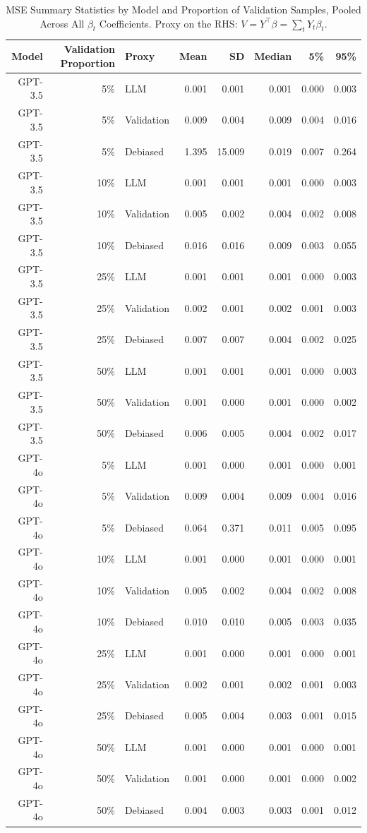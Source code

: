 \begin{table}

\caption{MSE Summary Statistics by Model and Proportion of Validation Samples, Pooled Across All $\beta_{t}$ Coefficients. Proxy on the RHS: $V = Y^\top \beta = \sum_{t} Y_t \beta_t$.}
\centering
\begin{tabular}[t]{rrlrrrrr}
\toprule
Model & Validation Proportion & Proxy & Mean & SD & Median & 5\% & 95\%\\
\midrule
GPT-3.5 & 5\% & LLM & 0.001 & 0.001 & 0.001 & 0.000 & 0.003\\
GPT-3.5 & 5\% & Validation & 0.009 & 0.004 & 0.009 & 0.004 & 0.016\\
GPT-3.5 & 5\% & Debiased & 1.395 & 15.009 & 0.019 & 0.007 & 0.264\\
GPT-3.5 & 10\% & LLM & 0.001 & 0.001 & 0.001 & 0.000 & 0.003\\
GPT-3.5 & 10\% & Validation & 0.005 & 0.002 & 0.004 & 0.002 & 0.008\\
GPT-3.5 & 10\% & Debiased & 0.016 & 0.016 & 0.009 & 0.003 & 0.055\\
GPT-3.5 & 25\% & LLM & 0.001 & 0.001 & 0.001 & 0.000 & 0.003\\
GPT-3.5 & 25\% & Validation & 0.002 & 0.001 & 0.002 & 0.001 & 0.003\\
GPT-3.5 & 25\% & Debiased & 0.007 & 0.007 & 0.004 & 0.002 & 0.025\\
GPT-3.5 & 50\% & LLM & 0.001 & 0.001 & 0.001 & 0.000 & 0.003\\
GPT-3.5 & 50\% & Validation & 0.001 & 0.000 & 0.001 & 0.000 & 0.002\\
GPT-3.5 & 50\% & Debiased & 0.006 & 0.005 & 0.004 & 0.002 & 0.017\\
GPT-4o & 5\% & LLM & 0.001 & 0.000 & 0.001 & 0.000 & 0.001\\
GPT-4o & 5\% & Validation & 0.009 & 0.004 & 0.009 & 0.004 & 0.016\\
GPT-4o & 5\% & Debiased & 0.064 & 0.371 & 0.011 & 0.005 & 0.095\\
GPT-4o & 10\% & LLM & 0.001 & 0.000 & 0.001 & 0.000 & 0.001\\
GPT-4o & 10\% & Validation & 0.005 & 0.002 & 0.004 & 0.002 & 0.008\\
GPT-4o & 10\% & Debiased & 0.010 & 0.010 & 0.005 & 0.003 & 0.035\\
GPT-4o & 25\% & LLM & 0.001 & 0.000 & 0.001 & 0.000 & 0.001\\
GPT-4o & 25\% & Validation & 0.002 & 0.001 & 0.002 & 0.001 & 0.003\\
GPT-4o & 25\% & Debiased & 0.005 & 0.004 & 0.003 & 0.001 & 0.015\\
GPT-4o & 50\% & LLM & 0.001 & 0.000 & 0.001 & 0.000 & 0.001\\
GPT-4o & 50\% & Validation & 0.001 & 0.000 & 0.001 & 0.000 & 0.002\\
GPT-4o & 50\% & Debiased & 0.004 & 0.003 & 0.003 & 0.001 & 0.012\\
\bottomrule
\end{tabular}
\end{table}
